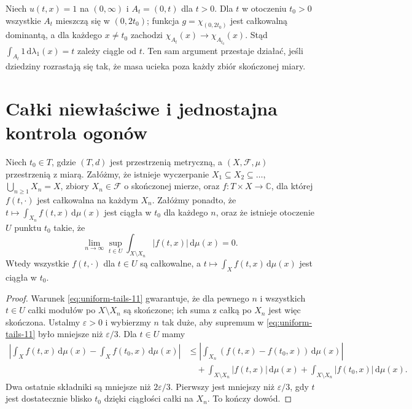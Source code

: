 \begin{przyklad}
Niech $u(t,x)=1$ na $(0,\infty)$ i $A_t=(0,t)$ dla $t>0$.
Dla $t$ w otoczeniu $t_0>0$ wszystkie $A_t$ mieszczą się
w $(0,2t_0)$; funkcja $g=\chi_{(0,2t_0)}$ jest
całkowalną dominantą, a dla każdego $x\ne t_0$
zachodzi $\chi_{A_t}(x)\to\chi_{A_{t_0}}(x)$.
Stąd $\int_{A_t}1\,\mathrm d\lambda_1(x)=t$ zależy ciągle od $t$.
Ten sam argument przestaje działać, jeśli dziedziny rozrastają
się tak, że masa ucieka poza każdy zbiór skończonej miary.
\end{przyklad}

\section{Całki niewłaściwe i jednostajna kontrola ogonów}

\begin{twierdzenie}
\label{thm:tails-11}
Niech $t_0\in T$, gdzie $(T,d)$ jest przestrzenią metryczną,
a $(X,\mathcal F,\mu)$ przestrzenią z miarą. Załóżmy, że
istnieje wyczerpanie $X_1\subseteq X_2\subseteq\dots$,
$\bigcup_{n\ge1}X_n=X$, zbiory $X_n\in\mathcal F$
o skończonej mierze, oraz $f:T\times X\to\mathbb C$,
dla której $f(t,\cdot)$ jest całkowalna na każdym $X_n$.
Załóżmy ponadto, że $t\mapsto\int_{X_n}f(t,x)\,\mathrm d\mu(x)$
jest ciągła w $t_0$ dla każdego $n$, oraz że istnieje
otoczenie $U$ punktu $t_0$ takie, że
\begin{equation}\label{eq:uniform-tails-11}
\lim_{n\to\infty}\sup_{t\in U}
\int_{X\setminus X_n}|f(t,x)|\,\mathrm d\mu(x)=0.
\end{equation}
Wtedy wszystkie $f(t,\cdot)$ dla $t\in U$ są całkowalne,
a $t\mapsto\int_Xf(t,x)\,\mathrm d\mu(x)$ jest ciągła w $t_0$.
\end{twierdzenie}
\begin{proof}
Warunek \eqref{eq:uniform-tails-11} gwarantuje, że dla
pewnego $n$ i wszystkich $t\in U$ całki modułów po
$X\setminus X_n$ są skończone; ich suma z całką po $X_n$
jest więc skończona. Ustalmy $\varepsilon>0$ i wybierzmy
$n$ tak duże, aby supremum w
\eqref{eq:uniform-tails-11} było mniejsze niż $\varepsilon/3$.
Dla $t\in U$ mamy
\begin{align*}
\left|\int_Xf(t,x)\,\mathrm d\mu(x)-\int_Xf(t_0,x)\,\mathrm d\mu(x)\right|
&\le\left|\int_{X_n}(f(t,x)-f(t_0,x))\,\mathrm d\mu(x)\right|\\
&\quad+\int_{X\setminus X_n}|f(t,x)|\,\mathrm d\mu(x)
+\int_{X\setminus X_n}|f(t_0,x)|\,\mathrm d\mu(x).
\end{align*}
Dwa ostatnie składniki są mniejsze niż $2\varepsilon/3$.
Pierwszy jest mniejszy niż $\varepsilon/3$, gdy $t$
jest dostatecznie blisko $t_0$ dzięki ciągłości
całki na $X_n$. To kończy dowód.
\end{proof}


